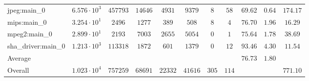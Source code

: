 \begin{tabular}{|l|c|c|c|c|c|c|c|c|c|c|}
jpeg:main\_0            & $ 6.576 \cdot 10^{3} $ & $ 457793 $ & $ 14646 $ & $ 4931  $ & $ 9379  $ & $ 8   $ & $ 58  $ & $ 69.62       $ & $ 0.64    $ & $ 174.17  $ \\
mips:main\_0            & $ 3.254 \cdot 10^{1} $ & $ 2496   $ & $ 1277  $ & $ 389   $ & $ 508   $ & $ 8   $ & $ 4   $ & $ 76.70       $ & $ 1.96    $ & $ 16.29   $ \\
mpeg2:main\_0           & $ 2.899 \cdot 10^{1} $ & $ 2193   $ & $ 7003  $ & $ 2655  $ & $ 5054  $ & $ 0   $ & $ 1   $ & $ 75.64       $ & $ 1.78    $ & $ 38.69   $ \\
sha\_driver:main\_0     & $ 1.213 \cdot 10^{3} $ & $ 113318 $ & $ 1872  $ & $ 601   $ & $ 1379  $ & $ 0   $ & $ 12  $ & $ 93.46       $ & $ 4.30    $ & $ 11.54   $ \\
\hline
Average                 & $                    $ & $        $ & $       $ & $       $ & $       $ & $     $ & $     $ & $ 76.73       $ & $ 1.80    $ & $         $ \\
\hline
Overall                 & $ 1.023 \cdot 10^{4} $ & $ 757259 $ & $ 68691 $ & $ 22332 $ & $ 41616 $ & $ 305 $ & $ 114 $ & $             $ & $         $ & $ 771.10  $ \\
\hline
\end{tabular}
